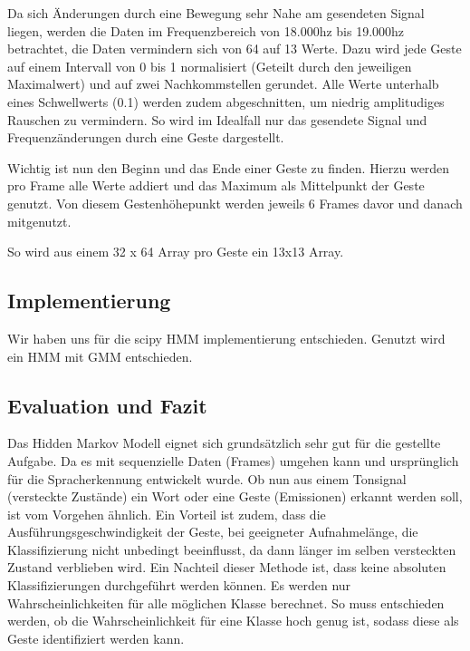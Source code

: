 Da sich Änderungen durch eine Bewegung sehr Nahe am gesendeten Signal liegen, werden die Daten im 
Frequenzbereich von 18.000hz bis 19.000hz betrachtet, die Daten vermindern sich von 64 auf 13 Werte. 
Dazu wird jede Geste auf einem Intervall von 0 bis 1 normalisiert (Geteilt durch den jeweiligen Maximalwert) und 
auf zwei Nachkommstellen gerundet. 
Alle Werte unterhalb eines Schwellwerts (0.1) werden zudem abgeschnitten, um niedrig amplitudiges Rauschen zu vermindern. 
So wird im Idealfall nur das gesendete Signal und Frequenzänderungen durch eine Geste dargestellt.

Wichtig ist nun den Beginn und das Ende einer Geste zu finden. Hierzu werden pro Frame alle Werte addiert 
und das Maximum als Mittelpunkt der Geste genutzt. Von diesem Gestenhöhepunkt werden jeweils 6 Frames davor und danach mitgenutzt.

So wird aus einem 32 x 64 Array pro Geste ein 13x13 Array.


\subsection{Implementierung}  \label{sec:impl}
Wir haben uns für die scipy HMM implementierung entschieden. 
Genutzt wird ein \acl{HMM} mit \acl{GMM} entschieden.


\subsection{Evaluation und Fazit}  \label{sec:result}
Das Hidden Markov Modell eignet sich grundsätzlich sehr gut für die gestellte Aufgabe. Da es mit sequenzielle Daten (Frames) umgehen 
kann und ursprünglich für die Spracherkennung entwickelt wurde. Ob nun aus einem Tonsignal (versteckte Zustände) ein Wort oder 
eine Geste (Emissionen) erkannt werden soll, ist vom Vorgehen ähnlich. Ein Vorteil ist zudem, dass die Ausführungsgeschwindigkeit
 der Geste, bei geeigneter Aufnahmelänge, die Klassifizierung nicht unbedingt beeinflusst, da dann länger im selben versteckten 
 Zustand verblieben wird.
Ein Nachteil dieser Methode ist, dass keine absoluten Klassifizierungen durchgeführt werden können. Es werden nur Wahrscheinlichkeiten für alle möglichen Klasse berechnet. So muss entschieden werden, ob die Wahrscheinlichkeit für eine Klasse hoch genug ist, sodass diese als Geste identifiziert werden kann.
